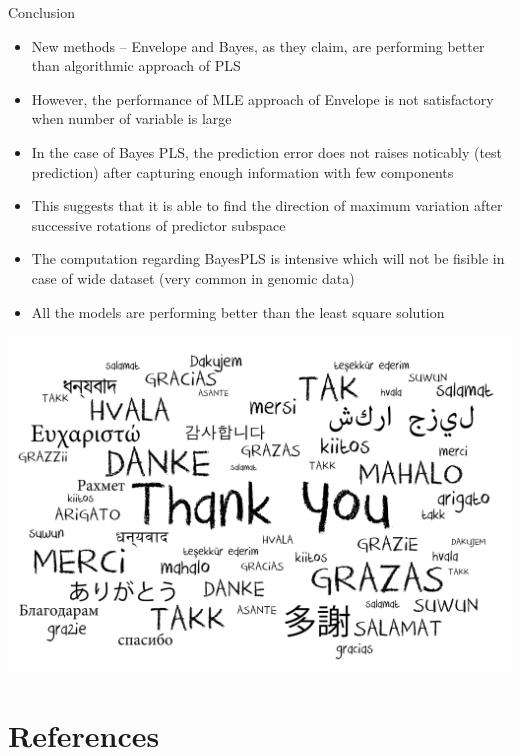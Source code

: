 \documentclass[ignorenonframetext,]{beamer}
\newif\ifbibliography
\providecommand{\tightlist}{%
  \setlength{\itemsep}{0pt}\setlength{\parskip}{0pt}}
\begin{document}
\begin{frame}{Conclusion}

\begin{itemize}[<+->]
\tightlist
\item
  New methods -- Envelope and Bayes, as they claim, are performing
  better than algorithmic approach of PLS
\item
  However, the performance of MLE approach of Envelope is not
  satisfactory when number of variable is large
\item
  In the case of Bayes PLS, the prediction error does not raises
  noticably (test prediction) after capturing enough information with
  few components
\item
  This suggests that it is able to find the direction of maximum
  variation after successive rotations of predictor subspace
\item
  The computation regarding BayesPLS is intensive which will not be
  fisible in case of wide dataset (very common in genomic data)
\item
  All the models are performing better than the least square solution
\end{itemize}

\end{frame}

\begin{frame}

\begin{center}\includegraphics{ThankYou} \end{center}

\end{frame}

\section{References}\label{references}

\begin{frame}[allowframebreaks]{}
\bibliographytrue

\end{frame}
\end{document}
